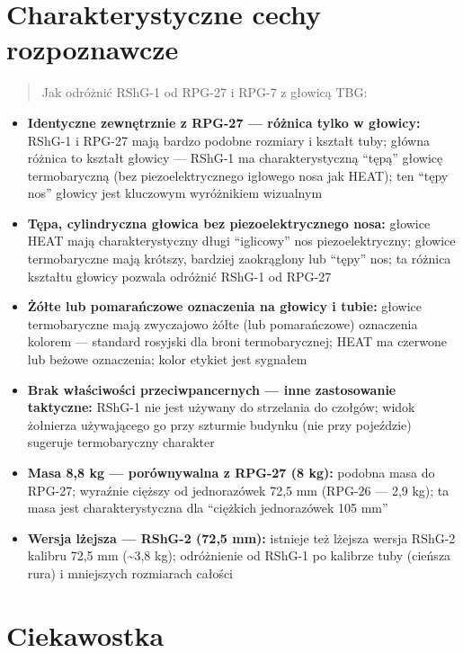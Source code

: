 \documentclass[12pt,openany,oneside]{book}
\providecommand{\tightlist}{%
  \setlength{\itemsep}{0pt}\setlength{\parskip}{0pt}}
\begin{document}
\section{Charakterystyczne cechy
rozpoznawcze}\label{charakterystyczne-cechy-rozpoznawcze-76}

\begin{quote}
Jak odróżnić RShG-1 od RPG-27 i RPG-7 z głowicą TBG:
\end{quote}

\begin{itemize}
\tightlist
\item
  \textbf{Identyczne zewnętrznie z RPG-27 --- różnica tylko w głowicy:}
  RShG-1 i RPG-27 mają bardzo podobne rozmiary i kształt tuby; główna
  różnica to kształt głowicy --- RShG-1 ma charakterystyczną ``tępą''
  głowicę termobaryczną (bez piezoelektrycznego igłowego nosa jak HEAT);
  ten ``tępy nos'' głowicy jest kluczowym wyróżnikiem wizualnym
\item
  \textbf{Tępa, cylindryczna głowica bez piezoelektrycznego nosa:}
  głowice HEAT mają charakterystyczny długi ``iglicowy'' nos
  piezoelektryczny; głowice termobaryczne mają krótszy, bardziej
  zaokrąglony lub ``tępy'' nos; ta różnica kształtu głowicy pozwala
  odróżnić RShG-1 od RPG-27
\item
  \textbf{Żółte lub pomarańczowe oznaczenia na głowicy i tubie:} głowice
  termobaryczne mają zwyczajowo żółte (lub pomarańczowe) oznaczenia
  kolorem --- standard rosyjski dla broni termobarycznej; HEAT ma
  czerwone lub beżowe oznaczenia; kolor etykiet jest sygnałem
\item
  \textbf{Brak właściwości przeciwpancernych --- inne zastosowanie
  taktyczne:} RShG-1 nie jest używany do strzelania do czołgów; widok
  żołnierza używającego go przy szturmie budynku (nie przy pojeździe)
  sugeruje termobaryczny charakter
\item
  \textbf{Masa 8,8 kg --- porównywalna z RPG-27 (8 kg):} podobna masa do
  RPG-27; wyraźnie cięższy od jednorazówek 72,5 mm (RPG-26 --- 2,9 kg);
  ta masa jest charakterystyczna dla ``ciężkich jednorazówek 105 mm''
\item
  \textbf{Wersja lżejsza --- RShG-2 (72,5 mm):} istnieje też lżejsza
  wersja RShG-2 kalibru 72,5 mm (\textasciitilde3,8 kg); odróżnienie od
  RShG-1 po kalibrze tuby (cieńsza rura) i mniejszych rozmiarach całości
\end{itemize}

\section{Ciekawostka}\label{ciekawostka-76}
\end{document}
